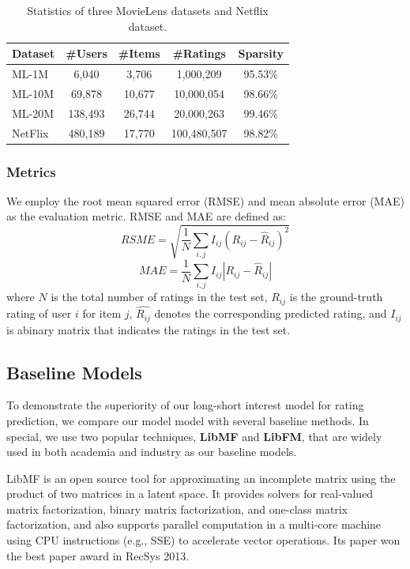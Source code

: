 \documentclass{sig-alternate-05-2015}
\begin{document}
\begin{table}[htpb]
    \centering
    \caption{Statistics of three MovieLens datasets and Netflix dataset.}
    \label{tab:statistics}
    \begin{tabular}{|l|c|c|c|c|}
        \hline
        \textbf{Dataset} & \textbf{\#Users} & \textbf{\#Items} & \textbf{\#Ratings} & \textbf{Sparsity} \\
        \hline
        ML-1M  & 6,040    & 3,706  & 1,000,209   & 95.53\% \\
        ML-10M & 69,878   & 10,677 & 10,000,054  & 98.66\% \\
        ML-20M & 138,493  & 26,744 & 20,000,263  & 99.46\% \\
        NetFlix & 480,189 & 17,770 & 100,480,507 & 98.82\% \\
        \hline
    \end{tabular}
\end{table}

\subsubsection{Metrics}
We employ the root mean squared error (RMSE) and mean absolute error (MAE) as the evaluation metric.
RMSE and MAE are defined as:
\begin{equation}
    RSME = \sqrt{ \frac{1}{N} \sum_{i,j} I_{ij} (R_{ij} - \hat{R}_{ij})^2 }
\end{equation}
\begin{equation}
    MAE = \frac{1}{N} \sum_{i,j} I_{ij} |R_{ij} - \hat{R}_{ij}|
\end{equation}
where $N$ is the total number of ratings in the test set,
$R_{ij}$ is the ground-truth rating of user $i$ for item $j$,
$\hat{R_{ij}}$ denotes the corresponding predicted rating,
and $I_{ij}$ is abinary matrix that indicates the ratings in the test set.

\subsection{Baseline Models}
To demonstrate the superiority of our long-short interest model for rating prediction,
we compare our model model with several baseline methods.
In special, we use two popular techniques, \textbf{LibMF} and \textbf{LibFM}, that are
widely used in both academia and industry as our baseline models.

LibMF is an open source tool for approximating an incomplete matrix
using the product of two matrices in a latent space.
It provides solvers for real-valued matrix factorization,
binary matrix factorization, and one-class matrix factorization, and 
also supports parallel computation in a multi-core machine using CPU instructions
(e.g., SSE) to accelerate vector operations.
Its paper \cite{chin2015fast} won the best paper award in RecSys 2013.
\end{document}
